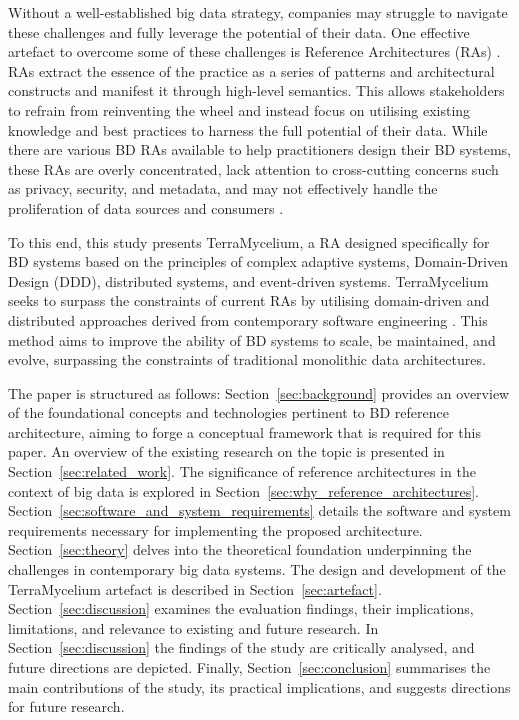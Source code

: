\documentclass[review]{elsarticle}
\begin{document}
Without a well-established big data strategy, companies may struggle to navigate these challenges and fully leverage the potential of their data. One effective artefact to overcome some of these challenges is Reference Architectures (RAs) \cite{Cloutier2010}. RAs extract the essence of the practice as a series of patterns and architectural constructs and manifest it through high-level semantics. This allows stakeholders to refrain from reinventing the wheel and instead focus on utilising existing knowledge and best practices to harness the full potential of their data. While there are various BD RAs available to help practitioners design their BD systems, these RAs are overly concentrated, lack attention to cross-cutting concerns such as privacy, security, and metadata, and may not effectively handle the proliferation of data sources and consumers \cite{ataei2022state,AtaeiACIS}.

To this end, this study presents TerraMycelium, a RA designed specifically for BD systems based on the principles of complex adaptive systems, Domain-Driven Design (DDD), distributed systems, and event-driven systems. TerraMycelium seeks to surpass the constraints of current RAs by utilising domain-driven and distributed approaches derived from contemporary software engineering \cite{ataei2023application}. This method aims to improve the ability of BD systems to scale, be maintained, and evolve, surpassing the constraints of traditional monolithic data architectures.

The paper is structured as follows: Section~\ref{sec:background} provides an overview of the foundational concepts and technologies pertinent to BD reference architecture, aiming to forge a conceptual framework that is required for this paper. An overview of the existing research on the topic is presented in Section~\ref{sec:related_work}. The significance of reference architectures in the context of big data is explored in Section~\ref{sec:why_reference_architectures}. Section~\ref{sec:software_and_system_requirements} details the software and system requirements necessary for implementing the proposed architecture. Section~\ref{sec:theory} delves into the theoretical foundation underpinning the challenges in contemporary big data systems. The design and development of the TerraMycelium artefact is described in Section~\ref{sec:artefact}. Section~\ref{sec:discussion} examines the evaluation findings, their implications, limitations, and relevance to existing and future research. In Section~\ref{sec:discussion} the findings of the study are critically analysed, and future directions are depicted. Finally, Section~\ref{sec:conclusion} summarises the main contributions of the study, its practical implications, and suggests directions for future research.
\end{document}
